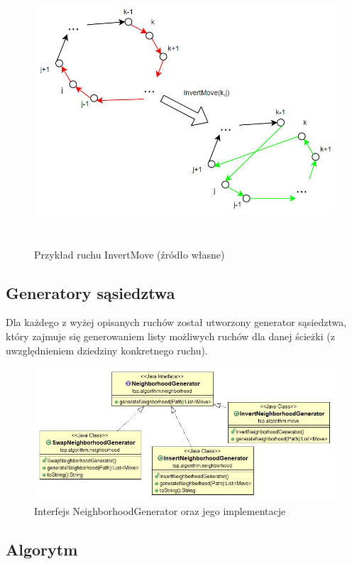 \documentclass[a4paper,11pt]{article}
\begin{document}
\begin{figure}[H]
\centering
\includegraphics[height=10cm]{InvertMove.JPG}
\caption{Przykład ruchu InvertMove (źródło własne)}
\end{figure}

\newpage
\subsection{Generatory sąsiedztwa}

Dla każdego z wyżej opisanych ruchów został utworzony generator sąsiedztwa, który zajmuje się generowaniem listy możliwych ruchów dla danej ścieżki (z uwzględnieniem dziedziny konkretnego ruchu).

\begin{figure}[H]
\centering
\includegraphics[width=17cm]{ClassNeighborhoodGenerator.JPG}
\caption{Interfejs NeighborhoodGenerator oraz jego implementacje}
\end{figure}

\subsection{Algorytm}
\end{document}

